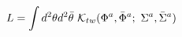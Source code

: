 \begin{equation}
\label{Ltwist}
L=\int d^2\theta d^2{\bar \theta}\ {\cal K}_{tw}(\Phi^{a}, {\bar \Phi}^{a};\   \Sigma^{a}, {\bar \Sigma}^{a})
\end{equation}

